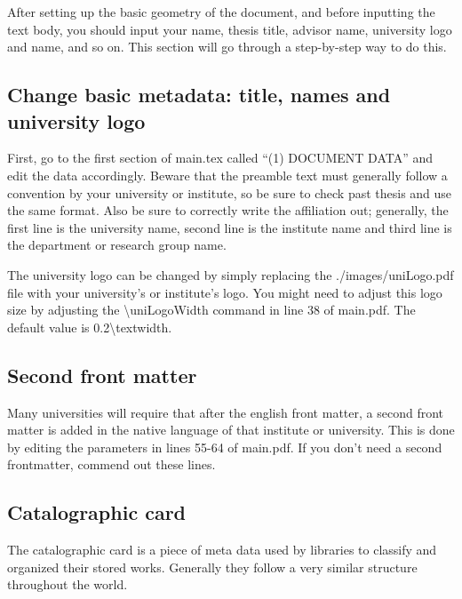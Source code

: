 	After setting up the basic geometry of the document, and before inputting the text body, you should input your name, thesis title, advisor name, university logo and name, and so on. This section will go through a step-by-step way to do this.

	\subsection{Change basic metadata: title, names and university logo}

	First, go to the first section of {\ttfamily\small main.tex} called {\ttfamily\small ``(1) DOCUMENT DATA''} and edit the data accordingly. Beware that the preamble text must generally follow a convention by your university or institute, so be sure to check past thesis and use the same format. Also be sure to correctly write the affiliation out; generally, the first line is the university name, second line is the institute name and third line is the department or research group name.

	The university logo can be changed by simply replacing the {\ttfamily\small ./images/uniLogo.pdf} file with your university's or institute's logo. You might need to adjust this logo size by adjusting the {\ttfamily\small \textbackslash uniLogoWidth} command in line 38 of {\ttfamily\small main.pdf}. The default value is {\ttfamily\small 0.2\textbackslash textwidth}.

	\subsection{Second front matter}%
	
	Many universities will require that after the english front matter, a second front matter is added in the native language of that institute or university. This is done by editing the parameters in lines 55-64 of {\ttfamily\small main.pdf}. If you don't need a second frontmatter, commend out these lines.

	\subsection{Catalographic card}%

	The catalographic card is a piece of meta data used by libraries to classify and organized their stored works. Generally they follow a very similar structure throughout the world.

